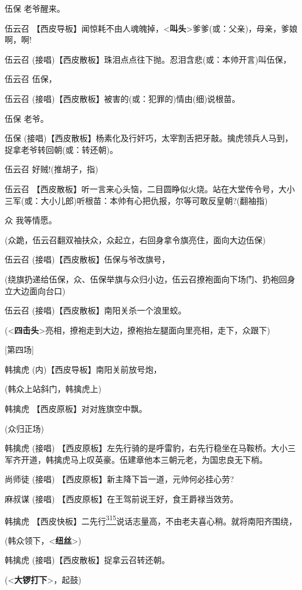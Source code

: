 伍保 老爷醒来。

伍云召
【西皮导板】闻惊耗不由人魂魄掉，\textless{}\textbf{叫头}\textgreater{}爹爹(或：父亲)，母亲，爹娘啊，啊!

伍云召 (接唱)【西皮散板】珠泪点点往下抛。忍泪含悲(或：本帅开言)叫伍保，

伍云召 伍保，

伍云召 (接唱)【西皮散板】被害的(或：犯罪的)情由(细)说根苗。

伍保 老爷。

伍保
(接唱)【西皮散板】杨素化及行奸巧，太宰割舌把牙敲。擒虎领兵人马到，捉拿老爷转回朝(或：转还朝)。

伍云召 好贼!(推胡子，指)

伍云召
【西皮散板】听一言来心头恼，二目圆睁似火烧。站在大堂传令号，大小三军(或：大小儿郎)听根苗：本帅有心把仇报，尔等可敢反皇朝?(翻袖指)

众 我等情愿。

(众跪，伍云召翻双袖扶众，众起立，右回身拿令旗亮住，面向大边伍保)

伍云召 (接唱)【西皮散板】伍保与爷改旗号，

(绕旗扔递给伍保，众、伍保举旗与众归小边，伍云召撩袍面向下场门、扔袍回身立大边面向台口)

伍云召 (接唱)【西皮散板】南阳关杀一个浪里蛟。

(\textless{}\textbf{四击头}\textgreater{}亮相，撩袍走到大边，撩袍抬左腿面向里亮相，走下，众跟下)

{[}第四场{]}

韩擒虎 (内)【西皮导板】南阳关前放号炮，

(韩众上站斜门，韩擒虎上)

韩擒虎 【西皮原板】对对旌旗空中飘。

(众归正场)

韩擒虎 (接唱)
【西皮原板】左先行骑的是呼雷豹，右先行稳坐在马鞍桥。大小三军齐开道，韩擒虎马上叹英豪。伍建章他本三朝元老，为国忠良无下梢。

尚师徒 (接唱) 【西皮原板】新主降下旨一道，元帅何必挂心劳?

麻叔谋 (接唱) 【西皮原板】在王驾前说王好，食王爵禄当效劳。

韩擒虎
【西皮快板】二先行\protect\hyperlink{fn315}{\textsuperscript{315}}说话志量高，不由老夫喜心稍。就将南阳齐围绕，

(韩众领下，\textless{}\textbf{纽丝}\textgreater{})

韩擒虎 (接唱)【西皮散板】捉拿云召转还朝。

(\textless{}\textbf{大锣打下}\textgreater{}，起鼓)

